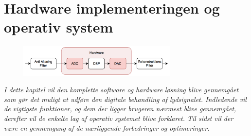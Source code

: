 \chapter{Hardware implementeringen og operativ system}\label{kap:hardware}

\begin{figure}[h]
	\vspace*{-1 cm}
	\includegraphics[width=8cm]{billeder/flow_hardware}
	\vspace{0.5 cm}
\end{figure}

\emph{I dette kapitel vil den komplette software og hardware løsning blive gennemgået som gør det muligt at udføre den digitale behandling af lydsignalet. Indledende vil de vigtigste funktioner, og dem der ligger brugeren nærmest blive gennemgået, derefter vil de enkelte lag af operativ systemet blive forklaret. Til sidst vil der være en gennemgang af de nærliggende forbedringer og optimeringer.}






